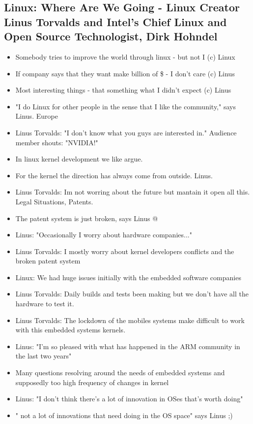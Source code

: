 \documentclass[10pt]{article}
\begin{document}
{\subsection{Linux: Where Are We Going - Linux Creator Linus Torvalds and Intel's Chief Linux and Open Source Technologist, Dirk Hohndel}
\begin{itemize}
\item  Somebody tries to improve the world through linux - but not I (c) Linux
\item  If company says that they want make billion of \$ - I don't care (c) Linus
\item  Most interesting things - that something what I didn't expect (c) Linus
\item "I do Linux for other people in the sense that I like the community," says Linus.  Europe
\item Linus Torvalds: "I don't know what you guys are interested in." Audience member shouts: "NVIDIA!" 
\item  In linux kernel development we like argue.
\item For the kernel the direction has always come from outside. Linus. 
\item Linus Torvalds: Im not worring about the future but mantain it open all this. Legal Situations, Patents. 
\item The patent system is just broken, says Linus @ 
\item Linus: "Occasionally I worry about hardware companies..." 
\item Linus Torvalds: I mostly worry about kernel developers conflicts and the broken patent system
\item Linux: We had huge issues initially with the embedded software companies 
\item Linus Torvalds: Daily builds and tests been making but we don't have all the hardware to test it. 
\item Linus Torvalds: The lockdown of the mobiles systems make difficult to work with this embedded systems kernels. 
\item Linus: "I'm so pleased with what has happened in the ARM community in the last two years" 
\item Many questions resolving around the needs of embedded systems and supposedly too high frequency of changes in kernel 
\item Linus: "I don't think there's a lot of innovation in OSes that's worth doing" 
\item " not a lot of innovations that need doing in the OS space" says Linus ;) 

\end{itemize}}
\end{document}

